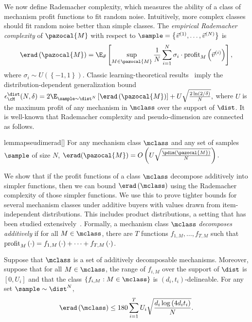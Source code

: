 We now define Rademacher complexity, which measures the ability of a class of mechanism profit functions to fit random noise. Intuitively, more complex classes should fit random noise better than simple classes. 
The \emph{empirical Rademacher complexity} of $\pazocal{M}$ with respect to $\sample= \left\{\vec{v}^{\left(1\right)}, \dots, \vec{v}^{\left(N\right)}\right\}$ is  \[\erad\left(\pazocal{M}\right) = \E_{\vec{\sigma}}\left[\sup_{M \in \pazocal{M}} \frac{1}{N} \sum_{i = 1}^N \sigma_i \cdot \profit_M\left(\vec{v}^{(i)}\right) \right],\] where $\sigma_i \sim U\left(\left\{-1,1\right\}\right)$. Classic learning-theoretical results~\citep{Bartlett02:Rademacher,Koltchinskii01:Rademacher} imply the distribution-dependent generalization bound $\epsilon_{\cM}^{\dist}(N, \delta) = 2\E_{\sample \sim \dist^N}\left[\erad\left(\pazocal{M}\right)\right] + U \sqrt{\frac{2\ln \left(2/\delta\right)}{N}},$ where $U$ is the maximum profit of any mechanism in $\mclass$ over the support of $\dist$.
It is well-known that Rademacher complexity and pseudo-dimension are connected as follows.

\begin{restatable}{lemma}{pseudimerad}[\cite{Pollard84:Convergence, Dudley87:Universal}]\label{lem:pdim2erad}
	For any mechanism class $\mclass$ and any set of samples $\sample$ of size $N$, $\erad(\pazocal{M}) = O\left(U \sqrt {\frac{\pdim(\pazocal{M})}{N}}\right).$
\end{restatable}

We show that if the profit functions of a class $\mclass$ decompose additively into simpler functions, then we can bound $\erad\left(\mclass\right)$ using the Rademacher complexity of those simpler functions. We use this to prove tighter bounds for several mechanism classes under additive buyers with values drawn from item-independent distributions. This includes product distributions, a setting that has been studied extensively~\citep[e.g.,][]{Hart12:Approximate, Cai17:Learning, Yao14:n, Cai16:Duality, Babaioff17:Menu}.
 Formally, a mechanism class $\mclass$ \emph{decomposes additively} if for all $M \in \mclass$, there are $T$ functions $f_{1, M}, \dots, f_{T, M}$ such that $\textnormal{profit}_{M}\left(\cdot\right) = f_{1, M}\left(\cdot\right) + \cdots + f_{T, M}\left(\cdot\right)$.

\begin{corollary}\label{cor:data}
Suppose that $\mclass$ is a set of additively decomposable mechanisms. Moreover, suppose that for all $M \in \mclass$, the range of $f_{i, M}$ over the support of $\dist$ is $[0, U_i]$ and that the class $\left\{f_{i, M} : M \in \mclass\right\}$ is $\left(d_i,t_i\right)$-delineable.
For any set $\sample \sim \dist^N$, \[\erad\left(\mclass\right) \leq 180\sum_{i = 1}^T U_i \sqrt{\frac{d_i\log \left(4d_it_i\right)}{N}}.\]
\end{corollary}

